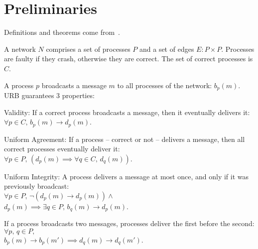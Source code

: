 
\section{Preliminaries}
\label{sec:preliminaries}

Definitions and theorems come from~\cite{hadzilacos1994modular}.

\begin{definition}[Network]
  A network $N$ comprises a set of processes $P$ and a set of edges
  $E: P \times P$. Processes are faulty if they crash, otherwise they are
  correct. The set of correct processes is $C$.
\end{definition}

\begin{definition}
\end{definition}

\begin{definition}
  A process $p$ broadcasts a message $m$ to all processes of the network:
  $b_p(m)$. URB guarantees 3 properties:

  \begin{asparadesc}
  \item [Validity:] If a correct process broadcasts a message, then it eventually
    delivers it: $\forall p \in C,\, b_p(m) \rightarrow d_p(m)$.
  \item [Uniform Agreement:] If a process -- correct or not -- delivers a message,
    then all correct processes eventually deliver it:\\
    $\forall p \in P,\, (d_p(m) \implies \forall q \in C,\, d_q(m))$.
  \item [Uniform Integrity:] A process delivers a message at most once, and
    only if it was previously broadcast:\\
    $\forall p \in P,\, \neg(d_p(m) \rightarrow d_p(m)) \wedge$\\$d_p(m)
    \implies \exists q \in P,\, b_q(m) \rightarrow d_p(m)$.
\end{asparadesc}

\end{definition}


\begin{definition}
  If a process broadcasts two messages, processes deliver the first before the
  second:\\
  $\forall p,\,q \in P,\,$\\$b_p(m) \rightarrow b_p(m') \implies d_q(m) \rightarrow
  d_q(m')$.
\end{definition}

